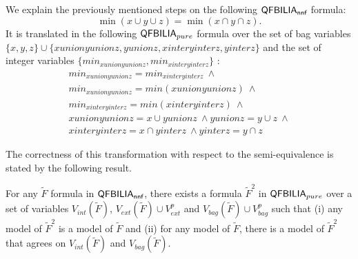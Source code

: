 \begin{myex}
We explain the previously mentioned steps on the following $\textsf{QFBILIA}_{\textsf{nnf}}$ formula:
$$\min(x \cup y \cup z) = \min(x \cap y \cap z).$$ 
It is translated in the following $\textsf{QFBILIA}_{pure}$ formula over the set of bag variables $\{x,y,z\}\cup\{xunionyunionz,yunionz,xinteryinterz,yinterz\}$
and the set of integer variables $\{min_{xunionyunionz},min_{xinteryinterz}\}$ :
\begin{align*}
min_{xunionyunionz} = min_{xinteryinterz} \ \land \\
  min_{xunionyunionz} = min(xunionyunionz) \  \land \\
  min_{xinteryinterz} = min(xinteryinterz) \ \land \\
  xunionyunionz = x \cup yunionz \ \land
  yunionz = y \cup z \ \land \\
  xinteryinterz = x \cap yinterz \ \land
  yinterz = y \cap z
\end{align*}
\end{myex}

The correctness of this transformation with respect to the semi-equivalence  is stated by the following result.

\begin{myprop}
\label{prop:pure}
For any $\tilde{F}$ formula in $\textsf{QFBILIA}_{\textsf{nnf}}$, there exists a formula $\tilde{F}^2$ in $\textsf{QFBILIA}_{pure}$ over a set of variables
$V_{int}(\tilde{F})$, $V_{ext}(\tilde{F})\cup V^p_{ext}$ and $V_{bag}(\tilde{F})\cup V^p_{bag}$ such that
(i) any model of $\tilde{F}^2$ is a model of $\tilde{F}$ and
(ii) for any model of $\tilde{F}$, there is a model of $\tilde{F}^2$ that agrees on $V_{int}(\tilde{F})$ and $V_{bag}(\tilde{F})$.
\end{myprop}

